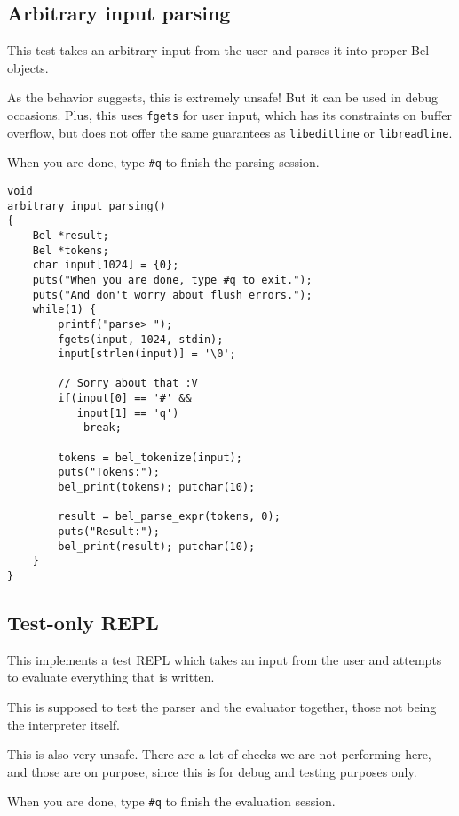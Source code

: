 \documentclass[openright,a4paper,twoside,12pt]{memoir}
\begin{document}
\subsection{Arbitrary input parsing}
\label{sec:org2b446fa}

This test  takes an arbitrary input  from the user and  parses it into
proper Bel objects.

As the behavior suggests, this is extremely unsafe! But it can be used
in debug  occasions. Plus, this uses  \texttt{fgets} for user input,  which has
its  constraints on  buffer  overflow,  but does  not  offer the  same
guarantees as \texttt{libeditline} or \texttt{libreadline}.

When you are done, type \texttt{\#q} to finish the parsing session.

\begin{verbatim}
void
arbitrary_input_parsing()
{
    Bel *result;
    Bel *tokens;
    char input[1024] = {0};
    puts("When you are done, type #q to exit.");
    puts("And don't worry about flush errors.");
    while(1) {
        printf("parse> ");
        fgets(input, 1024, stdin);
        input[strlen(input)] = '\0';

        // Sorry about that :V
        if(input[0] == '#' &&
           input[1] == 'q')
            break;

        tokens = bel_tokenize(input);
        puts("Tokens:");
        bel_print(tokens); putchar(10);

        result = bel_parse_expr(tokens, 0);
        puts("Result:");
        bel_print(result); putchar(10);
    }
}
\end{verbatim}

\subsection{Test-only REPL}
\label{sec:org7559da5}

This implements  a test REPL  which takes an  input from the  user and
attempts to evaluate everything that is written.

This is supposed to test the  parser and the evaluator together, those
not being the interpreter itself.

This  is also  very unsafe.  There  are a  lot  of checks  we are  not
performing here, and those are on purpose, since this is for debug and
testing purposes only.

When you are done, type \texttt{\#q} to finish the evaluation session.
\end{document}
